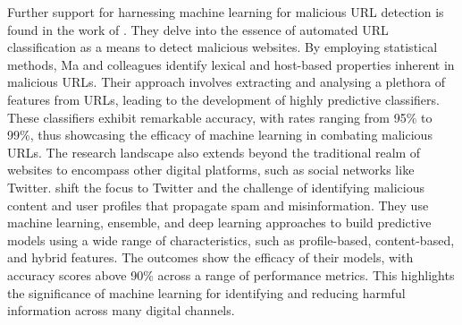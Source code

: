 Further support for harnessing machine learning for malicious URL detection is found in the work of \cite{ma2009beyond}. They delve into the essence of automated URL classification as a means to detect malicious websites. By employing statistical methods, Ma and colleagues identify lexical and host-based properties inherent in malicious URLs. Their approach involves extracting and analysing a plethora of features from URLs, leading to the development of highly predictive classifiers. These classifiers exhibit remarkable accuracy, with rates ranging from 95\% to 99\%, thus showcasing the efficacy of machine learning in combating malicious URLs.
The research landscape also extends beyond the traditional realm of websites to encompass other digital platforms, such as social networks like Twitter.  \cite{gangwar2022predictive} shift the focus to Twitter and the challenge of identifying malicious content and user profiles that propagate spam and misinformation. They use machine learning, ensemble, and deep learning approaches to build predictive models using a wide range of characteristics, such as profile-based, content-based, and hybrid features. The outcomes show the efficacy of their models, with accuracy scores above 90\% across a range of performance metrics. This highlights the significance of machine learning for identifying and reducing harmful information across many digital channels.



